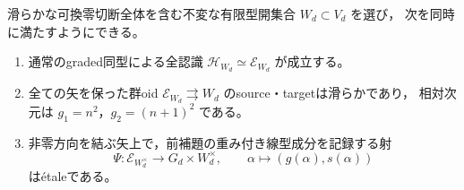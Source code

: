\begin{theorem}[可換零切断近傍の全同値群oidの滑らかさ]
\label{thm:full-source-smooth-zero-neighborhood}
滑らかな可換零切断全体を含む不変な有限型開集合 $W_d\subset V_d$ を選び，
次を同時に満たすようにできる。
\begin{enumerate}
\item 通常のgraded同型による全認識
      $\mathcal H_{W_d}\simeq\mathcal E_{W_d}$ が成立する。
\item 全ての矢を保った群oid
      $\mathcal E_{W_d}\rightrightarrows W_d$ のsource・targetは滑らかであり，
      相対次元は $g_1=n^2$，$g_2=(n+1)^2$ である。
\item 非零方向を結ぶ矢上で，前補題の重み付き線型成分を記録する射
      \[
       \Psi:\mathcal E_{W_d^\times}\longrightarrow G_d\times W_d^\times,
       \qquad \alpha\longmapsto(g(\alpha),s(\alpha))
      \]
      は\'{e}taleである。
\end{enumerate}
\end{theorem}
